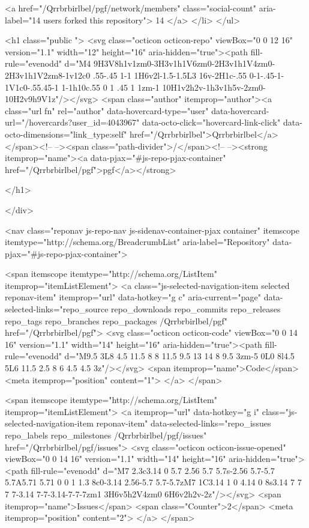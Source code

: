     <a href="/Qrrbrbirlbel/pgf/network/members" class="social-count"
       aria-label="14 users forked this repository">
      14
    </a>
  </li>
</ul>

      <h1 class="public ">
  <svg class="octicon octicon-repo" viewBox="0 0 12 16" version="1.1" width="12" height="16" aria-hidden="true"><path fill-rule="evenodd" d="M4 9H3V8h1v1zm0-3H3v1h1V6zm0-2H3v1h1V4zm0-2H3v1h1V2zm8-1v12c0 .55-.45 1-1 1H6v2l-1.5-1.5L3 16v-2H1c-.55 0-1-.45-1-1V1c0-.55.45-1 1-1h10c.55 0 1 .45 1 1zm-1 10H1v2h2v-1h3v1h5v-2zm0-10H2v9h9V1z"/></svg>
  <span class="author" itemprop="author"><a class="url fn" rel="author" data-hovercard-type="user" data-hovercard-url="/hovercards?user_id=4043967" data-octo-click="hovercard-link-click" data-octo-dimensions="link_type:self" href="/Qrrbrbirlbel">Qrrbrbirlbel</a></span><!--
--><span class="path-divider">/</span><!--
--><strong itemprop="name"><a data-pjax="#js-repo-pjax-container" href="/Qrrbrbirlbel/pgf">pgf</a></strong>

</h1>

    </div>
    
<nav class="reponav js-repo-nav js-sidenav-container-pjax container"
     itemscope
     itemtype="http://schema.org/BreadcrumbList"
    aria-label="Repository"
     data-pjax="#js-repo-pjax-container">

  <span itemscope itemtype="http://schema.org/ListItem" itemprop="itemListElement">
    <a class="js-selected-navigation-item selected reponav-item" itemprop="url" data-hotkey="g c" aria-current="page" data-selected-links="repo_source repo_downloads repo_commits repo_releases repo_tags repo_branches repo_packages /Qrrbrbirlbel/pgf" href="/Qrrbrbirlbel/pgf">
      <svg class="octicon octicon-code" viewBox="0 0 14 16" version="1.1" width="14" height="16" aria-hidden="true"><path fill-rule="evenodd" d="M9.5 3L8 4.5 11.5 8 8 11.5 9.5 13 14 8 9.5 3zm-5 0L0 8l4.5 5L6 11.5 2.5 8 6 4.5 4.5 3z"/></svg>
      <span itemprop="name">Code</span>
      <meta itemprop="position" content="1">
</a>  </span>

    <span itemscope itemtype="http://schema.org/ListItem" itemprop="itemListElement">
      <a itemprop="url" data-hotkey="g i" class="js-selected-navigation-item reponav-item" data-selected-links="repo_issues repo_labels repo_milestones /Qrrbrbirlbel/pgf/issues" href="/Qrrbrbirlbel/pgf/issues">
        <svg class="octicon octicon-issue-opened" viewBox="0 0 14 16" version="1.1" width="14" height="16" aria-hidden="true"><path fill-rule="evenodd" d="M7 2.3c3.14 0 5.7 2.56 5.7 5.7s-2.56 5.7-5.7 5.7A5.71 5.71 0 0 1 1.3 8c0-3.14 2.56-5.7 5.7-5.7zM7 1C3.14 1 0 4.14 0 8s3.14 7 7 7 7-3.14 7-7-3.14-7-7-7zm1 3H6v5h2V4zm0 6H6v2h2v-2z"/></svg>
        <span itemprop="name">Issues</span>
        <span class="Counter">2</span>
        <meta itemprop="position" content="2">
</a>    </span>

